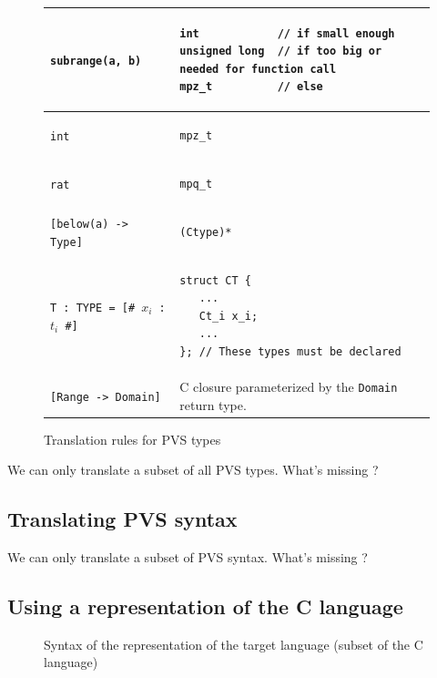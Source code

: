 \documentclass[12pt,a4paper,titlepage]{article}
\newcommand{\cl}[1]{\texttt{#1}}
\begin{document}
\begin{figure}[h!]
\begin{tabular}{|l|l|}
\hline
\cl{subrange(a, b)} &
\begin{lstlisting}
int            // if small enough
unsigned long  // if too big or needed for function call
mpz_t          // else
\end{lstlisting} \\ \hline
\cl{int} &
\begin{lstlisting}
mpz_t
\end{lstlisting} \\ \hline
\cl{rat} &
\begin{lstlisting}
mpq_t
\end{lstlisting} \\ \hline
\cl{[below(a) -> Type]} &
\begin{lstlisting}
(Ctype)*
\end{lstlisting} \\ \hline
\cl{T : TYPE = [\# $x_i$ : $t_i$ \#]}  &
\begin{lstlisting}
struct CT {
   ...
   Ct_i x_i;
   ...
}; // These types must be declared
\end{lstlisting} \\ \hline
\cl{[Range -> Domain]} & C closure parameterized by the \cl{Domain} return type.\\ \hline
\end{tabular}
\caption{Translation rules for PVS types}
\end{figure}









We can only translate a subset of all PVS types.
What's missing ?




\subsection{Translating PVS syntax}


We can only translate a subset of PVS syntax.
What's missing ?



\subsection{Using a representation of the C language}

\begin{figure}

\caption{Syntax of the representation of the target language (subset of the C language)}
\end{figure}
\end{document}
